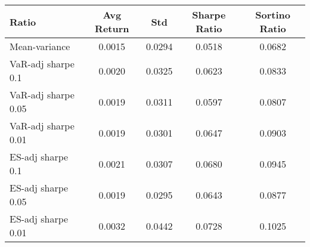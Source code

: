 \begin{tabular}{lcccc}
\toprule
Ratio & Avg Return & Std & Sharpe Ratio & Sortino Ratio\\
\midrule
Mean-variance & 0.0015 & 0.0294 & 0.0518 & 0.0682\\
VaR-adj sharpe 0.1 & 0.0020 & 0.0325 & 0.0623 & 0.0833\\
VaR-adj sharpe 0.05 & 0.0019 & 0.0311 & 0.0597 & 0.0807\\
VaR-adj sharpe 0.01 & 0.0019 & 0.0301 & 0.0647 & 0.0903\\
ES-adj sharpe 0.1 & 0.0021 & 0.0307 & 0.0680 & 0.0945\\
ES-adj sharpe 0.05 & 0.0019 & 0.0295 & 0.0643 & 0.0877\\
ES-adj sharpe 0.01 & 0.0032 & 0.0442 & 0.0728 & 0.1025\\
\bottomrule
\end{tabular}
